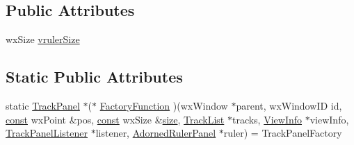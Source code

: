 \subsection*{Public Attributes}
\begin{DoxyCompactItemize}
\item 
wx\+Size \hyperlink{class_track_panel_a6db02b5d0562bf11311bc2df73a0864a}{vruler\+Size}
\end{DoxyCompactItemize}
\subsection*{Static Public Attributes}
\begin{DoxyCompactItemize}
\item 
static \hyperlink{class_track_panel}{Track\+Panel} $\ast$($\ast$ \hyperlink{class_track_panel_ab446ba22f650d9366bac877c10ebe4f8}{Factory\+Function} )(wx\+Window $\ast$parent, wx\+Window\+ID id, \hyperlink{getopt1_8c_a2c212835823e3c54a8ab6d95c652660e}{const} wx\+Point \&pos, \hyperlink{getopt1_8c_a2c212835823e3c54a8ab6d95c652660e}{const} wx\+Size \&\hyperlink{group__lavu__mem_ga854352f53b148adc24983a58a1866d66}{size}, \hyperlink{class_track_list}{Track\+List} $\ast$tracks, \hyperlink{class_view_info}{View\+Info} $\ast$view\+Info, \hyperlink{class_track_panel_listener}{Track\+Panel\+Listener} $\ast$listener, \hyperlink{class_adorned_ruler_panel}{Adorned\+Ruler\+Panel} $\ast$ruler) = Track\+Panel\+Factory
\end{DoxyCompactItemize}
